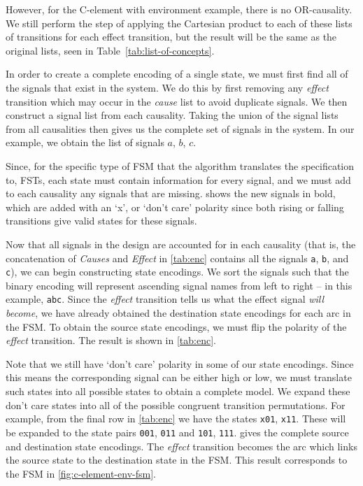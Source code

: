 However, for the C-element with environment example, there is no OR-causality. 
We still perform the step of applying the Cartesian product to each of these 
lists of transitions for each effect transition, but the result will be the 
same as the original lists, seen in Table~\ref{tab:list-of-concepts}.

In order to create a complete encoding of a single state, we must first find all of the signals that exist in the system.
We do this by first removing any \emph{effect} transition which may occur in the \emph{cause} list to avoid duplicate signals.
We then construct a signal list from each causality.
Taking the union of the signal lists from all causalities then gives us the complete set of signals in the system.
In our example, we obtain the list of signals $a$, $b$, $c$.

Since, for the specific type of FSM that the algorithm translates the specification to, FSTs, each state must contain information for every signal, 
and we must add to each causality any signals that are missing.
 shows the new signals in bold, which are added with an `x', or `don't care' polarity since both rising or falling transitions give valid states for these signals.

Now that all signals in the design are accounted for in each causality (that is, the concatenation of \emph{Causes} and \emph{Effect} in \cref{tab:enc} contains all the signals \texttt{a}, \texttt{b}, and \texttt{c}), we can begin constructing state encodings.
We sort the signals such that the binary encoding will represent ascending signal names from left to right -- in this example, \texttt{abc}.
Since the \emph{effect} transition tells us what the effect signal \emph{will become}, we have already obtained the destination state encodings for each arc in the FSM\@.
To obtain the source state encodings, we must flip the polarity of the \emph{effect} transition.
The result is shown in \cref{tab:enc}.

Note that we still have `don't care' polarity in some of our state encodings.
Since this means the corresponding signal can be either high or low, we must translate such states into all possible states to obtain a complete model.
We expand these don't care states into all of the possible congruent transition permutations.
For example, from the final row in \cref{tab:enc} we have the states \texttt{x01}, \texttt{x11}.
These will be expanded to the state pairs \texttt{001}, \texttt{011} and \texttt{101}, \texttt{111}.
 gives the complete source and destination state encodings.
The \emph{effect} transition becomes the arc which links the source state to the destination state in the FSM\@.
This result corresponds to the FSM in \cref{fig:c-element-env-fsm}.

